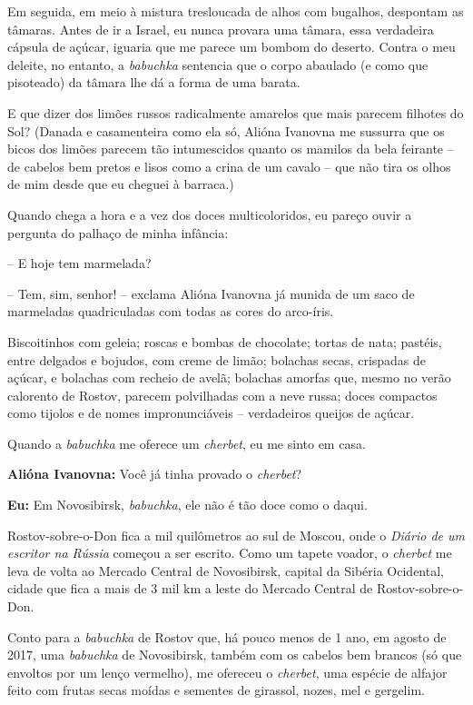 Em seguida, em meio à mistura tresloucada de alhos com bugalhos,
despontam as tâmaras. Antes de ir a Israel, eu nunca provara uma tâmara,
essa verdadeira cápsula de açúcar, iguaria que me parece um bombom do
deserto. Contra o meu deleite, no entanto, a \emph{babuchka} sentencia
que o corpo abaulado (e como que pisoteado) da tâmara lhe dá a forma de
uma barata.

E que dizer dos limões russos radicalmente amarelos que mais parecem
filhotes do Sol? (Danada e casamenteira como ela só, Alióna Ivanovna me
sussurra que os bicos dos limões parecem tão intumescidos quanto os
mamilos da bela feirante -- de cabelos bem pretos e lisos como a crina
de um cavalo -- que não tira os olhos de mim desde que eu cheguei à
barraca.)

Quando chega a hora e a vez dos doces multicoloridos, eu pareço ouvir a
pergunta do palhaço de minha infância:

-- E hoje tem marmelada?

-- Tem, sim, senhor! -- exclama Alióna Ivanovna já munida de um saco de
marmeladas quadriculadas com todas as cores do arco-íris.

Biscoitinhos com geleia; roscas e bombas de chocolate; tortas de nata;
pastéis, entre delgados e bojudos, com creme de limão; bolachas secas,
crispadas de açúcar, e bolachas com recheio de avelã; bolachas amorfas
que, mesmo no verão calorento de Rostov, parecem polvilhadas com a neve
russa; doces compactos como tijolos e de nomes impronunciáveis --
verdadeiros queijos de açúcar.

Quando a \emph{babuchka} me oferece um \emph{cherbet}, eu me sinto em
casa.

\textbf{Alióna Ivanovna:} Você já tinha provado o \emph{cherbet}?

\textbf{Eu:} Em Novosibirsk, \emph{babuchka}, ele não é tão doce como o
daqui.

Rostov-sobre-o-Don fica a mil quilômetros ao sul de Moscou, onde o
\emph{Diário de um escritor na Rússia} começou a ser escrito. Como um
tapete voador, o \emph{cherbet} me leva de volta ao Mercado Central de
Novosibirsk, capital da Sibéria Ocidental, cidade que fica a mais de 3
mil km a leste do Mercado Central de Rostov-sobre-o-Don.

Conto para a \emph{babuchka} de Rostov que, há pouco menos de 1 ano, em
agosto de 2017, uma \emph{babuchka} de Novosibirsk, também com os
cabelos bem brancos (só que envoltos por um lenço vermelho), me ofereceu
o \emph{cherbet}, uma espécie de alfajor feito com frutas secas moídas e
sementes de girassol, nozes, mel e gergelim.

